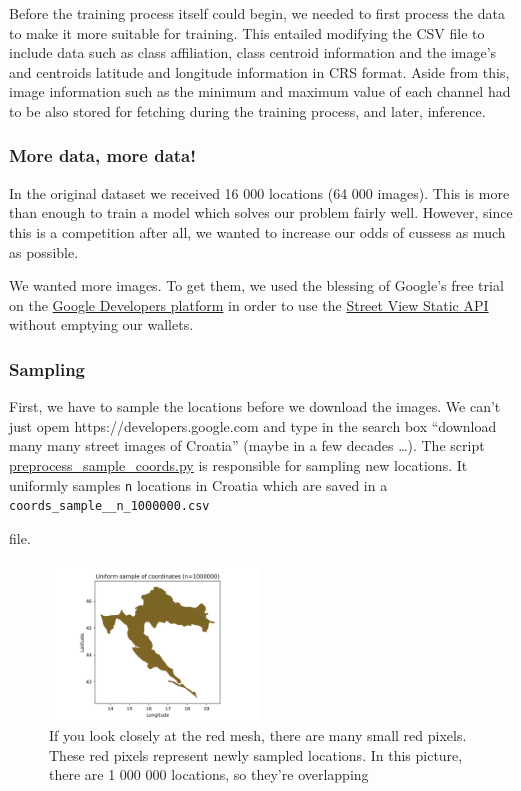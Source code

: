 \documentclass[]{article}
\let\oldtexttt\texttt
\renewcommand{\texttt}[1]{
  \textcolor{tcolor}{\colorbox{bgcolor}{\oldtexttt{#1}}}
}
\begin{document}
Before the training process itself could begin, we needed to first
process the data to make it more suitable for training. This entailed
modifying the CSV file to include data such as class affiliation, class
centroid information and the image's and centroids latitude and
longitude information in CRS format. Aside from this, image information
such as the minimum and maximum value of each channel had to be also
stored for fetching during the training process, and later, inference.

\hypertarget{more-data-more-data}{%
\subsubsection{More data, more data!}\label{more-data-more-data}}

In the original dataset we received 16 000 locations (64 000 images).
This is more than enough to train a model which solves our problem
fairly well. However, since this is a competition after all, we wanted
to increase our odds of cussess as much as possible.

We wanted more images. To get them, we used the blessing of Google's
free trial on the \href{https://developers.google.com/}{Google
Developers platform} in order to use the
\href{https://developers.google.com/maps/documentation/streetview/overview}{Street
View Static API} without emptying our wallets.

\hypertarget{sampling}{%
\subsubsection{Sampling}\label{sampling}}

First, we have to sample the locations before we download the images. We
can't just opem https://developers.google.com and type in the search box
``download many many street images of Croatia'' (maybe in a few decades
\ldots{}). The script \url{preprocess_sample_coords.py} is responsible
for sampling new locations. It uniformly samples \texttt{n} locations in
Croatia which are saved in a \texttt{coords\_sample\_\_n\_1000000.csv}
file.

\begin{figure}
\centering
\includegraphics[width=0.5\textwidth,height=\textheight]{./tex2pdf.-3ffa51a14b505aec/017b6988ddfcb744a932b1aa339b29cb312ab48d.png}
\caption{If you look closely at the red mesh, there are many small red
pixels. These red pixels represent newly sampled locations. In this
picture, there are 1 000 000 locations, so they're overlapping}
\end{figure}
\end{document}
